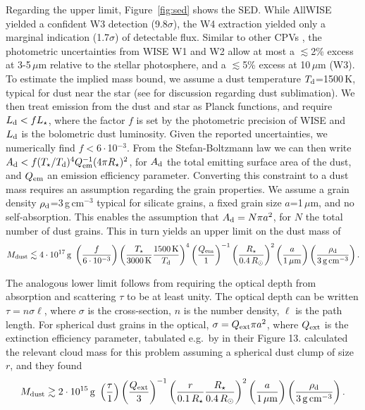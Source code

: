 \documentclass{nature3}
\begin{document}
\begin{methods}
Regarding the upper limit, Figure~\ref{fig:sed} shows the SED.  While
AllWISE \cite{Cutri2014} yielded a confident W3 detection
(9.8$\sigma$), the W4 extraction yielded only a marginal indication
(1.7$\sigma$) of detectable flux.  Similar to other CPVs
\cite{Stauffer2017,Bouma2024}, the photometric uncertainties from WISE
W1 and W2 allow at most a $\lesssim$2\% excess at 3-5\,$\mu$m relative
to the stellar photosphere, and a $\lesssim$5\% excess at 10\,$\mu$m
(W3).  To estimate the implied mass bound, we assume a dust
temperature $T_{\rm d}$=1500\,K, typical for dust near the star (see
\cite{Zhan2019} for discussion regarding dust sublimation).  We then
treat emission from the dust and star as Planck functions, and require
$L_{\rm d} < f L_\star$, where the factor $f$ is set by the
photometric precision of WISE and $L_{\rm d}$ is the bolometric dust
luminosity.  Given the reported uncertainties, we numerically find
$f<6\cdot$10$^{-3}$.  From the Stefan-Boltzmann law we can then write
$A_{\rm d} < f (T_\star / T_{\rm d})^4 Q_{\rm em}^{-1} (4\pi
R_\star)^2$, for $A_{\rm d}$ the total emitting surface area of the
dust, and $Q_{\rm em}$ an emission efficiency parameter.  Converting
this constraint to a dust mass requires an assumption regarding the
grain properties.  We assume a grain density $\rho_{\rm
d}$=3\,g\,cm$^{-3}$ typical for silicate grains, a fixed grain size
$a$=1\,$\mu$m, and no self-absorption.  This enables the assumption
that $A_{\rm d} = N \pi a^2$, for $N$ the total number of dust grains.
This in turn yields an upper limit on the dust mass of
\begin{equation}
  M_{\rm dust} \lesssim 4 \cdot 10^{17}\, {\rm g}\ 
  \left( \frac{f}{6\cdot10^{-3}} \right)
  \left( \frac{T_\star}{3000\,{\rm K}} \frac{1500\,{\rm K}}{T_{\rm d}} \right)^4
  \left( \frac{Q_{\rm em}}{1} \right)^{-1}
  \left( \frac{R_\star}{0.4\,R_\odot} \right)^2
  \left( \frac{a}{1\,\mathrm{\mu m}} \right)
  \left( \frac{\rho_{\rm d}}{3\,\mathrm{g\,cm^{-3}}} \right).
\end{equation}

The analogous lower limit follows from requiring the optical depth
from absorption and scattering $\tau$ to be at least unity.  The
optical depth can be written $\tau = n \sigma \ell$, where
$\sigma$ is the cross-section, $n$ is the number density, $\ell$ is
the path length.  For spherical dust
grains in the optical, $\sigma = Q_{\rm ext} \pi a^2$, where $Q_{\rm
ext}$ is the extinction efficiency parameter, tabulated e.g.~by
\cite{Croll2014} in their Figure 13.  \cite{Sanderson2023} calculated
the relevant cloud mass for this problem assuming a spherical dust
clump of size $r$, and they found
\begin{equation}
  M_{\rm dust} \gtrsim 2 \cdot 10^{15}\, {\rm g}\ 
  \left( \frac{\tau}{1} \right)
  \left( \frac{Q_{\rm ext}}{3} \right)^{-1}
  \left( \frac{r}{0.1\,R_\star} \frac{R_\star}{0.4\,R_\odot} \right)^2
  \left( \frac{a}{1\,\mathrm{\mu m}} \right)
  \left( \frac{\rho_{\rm d}}{3\,\mathrm{g\,cm^{-3}}} \right).
\end{equation}


\end{methods}
\end{document}
